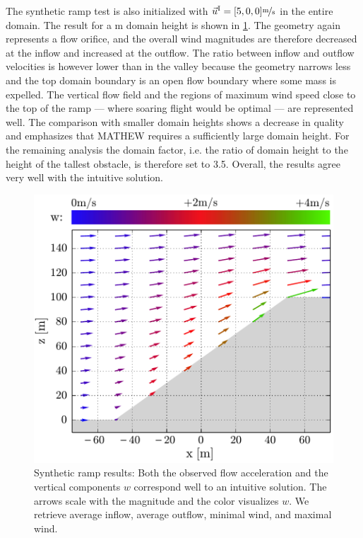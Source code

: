 \documentclass[twocolumn,letterpaper]{IEEEAerospaceCLS}
\begin{document}
The synthetic ramp test is also initialized with $\vec{u}^\text{I}=[5,0,0]\unitfrac[]{m}{s}$ in the entire domain. The result for a \unit[600]{m} domain height is shown in \cref{fig:PL_WindPred_ramp_example}. The geometry again represents a flow orifice, and the overall wind magnitudes are therefore decreased at the inflow and increased at the outflow. The ratio between inflow and outflow velocities is however lower than in the valley because the geometry narrows less and the top domain boundary is an open flow boundary where some mass is expelled. The vertical flow field and the regions of maximum wind speed close to the top of the ramp --- where soaring flight would be optimal --- are represented well. The comparison with smaller domain heights shows a decrease in quality and emphasizes that MATHEW requires a sufficiently large domain height. For the remaining analysis the domain factor, i.e. the ratio of domain height to the height of the tallest obstacle, is therefore set to 3.5. Overall, the results agree very well with the intuitive solution.

\begin{figure}[htbp]
\centering
\includegraphics[width=\columnwidth]{images/WindPred/Results/u_pred_ramp_df06_00.pdf}
\caption[Results for the synthetic ramp test case]{Synthetic ramp results: Both the observed flow acceleration and the vertical components $w$ correspond well to an intuitive solution. The arrows scale with the magnitude and the color visualizes $w$. We retrieve {} average inflow, {} average outflow, {} minimal wind, and {} maximal wind.}
\label{fig:PL_WindPred_ramp_example}
\end{figure}
\end{document}
